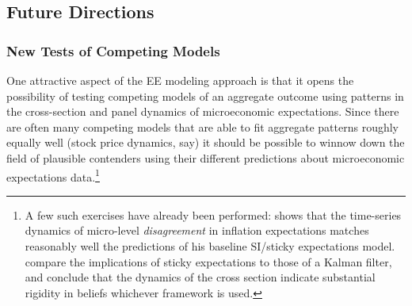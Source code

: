 \subsection{Future Directions}\label{subsec:future}\hypertarget{future}{}

\subsubsection{New Tests of Competing Models}
One attractive aspect of the EE modeling approach is that it opens the possibility of testing competing models of an aggregate outcome using patterns in the cross-section and panel dynamics of microeconomic expectations.  Since there are often many competing models that are able to fit aggregate patterns roughly equally well (stock price dynamics, say) it should be possible to winnow down the field of plausible contenders using their different predictions about microeconomic expectations data.\footnote{A few such exercises have already been performed: \cite{carroll2001epidemiology} shows that the time-series dynamics of micro-level \textit{disagreement} in inflation expectations matches reasonably well the predictions of his baseline SI/sticky expectations model.  \cite{coibion2012can} compare the implications of sticky expectations to those of a Kalman filter, and conclude that the dynamics of the cross section indicate substantial rigidity in beliefs whichever framework is used.}

